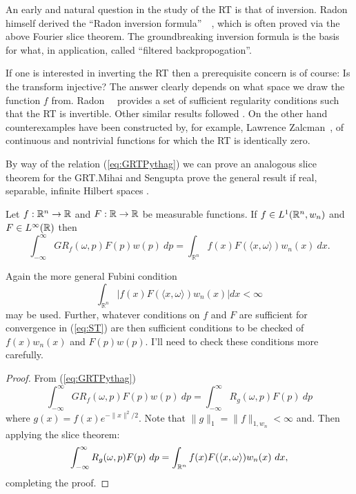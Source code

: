 An early and natural question in the study of the RT is that of inversion. Radon himself derived the ``Radon inversion formula''~\cite{Rado17}~\cite{Rado86}, which is often proved via the above Fourier slice theorem. The groundbreaking inversion formula is the basis for what, in application, called ``filtered backpropogation''.

If one is interested in inverting the RT then a prerequisite concern is of course: Is the transform injective? The answer clearly depends on what space we draw the function $f$ from. Radon~\cite{Rado17}~\cite{Rado86} provides a set of sufficient regularity conditions such that the RT is invertible. Other similar results followed \cite{????}. On the other hand counterexamples have been constructed by, for example, Lawrence Zalcman~\cite{Zalc82}, of continuous and nontrivial functions for which the RT is identically zero.

By way of the relation (\ref{eq:GRTPythag}) we can prove an analogous slice theorem for the GRT.\@ Mihai and Sengupta prove the general result if real, separable, infinite Hilbert spaces \cn.

\begin{proposition} 
  Let $f:\mathbb{R}^n \rightarrow \mathbb{R}$ and $F:\mathbb{R} \rightarrow \mathbb{R}$ be measurable functions. If $f \in L^1(\mathbb{R}^n, w_n)$ and $F \in L^\infty(\mathbb{R})$ then
  \begin{equation}\label{eq:GST}
    \int_{-\infty}^\infty GR_f(\omega, p)F(p) w(p) ~dp
    = \int_{\mathbb{R}^n}f(x) F(\langle x, \omega\rangle) w_n(x) ~dx. 
  \end{equation}
\end{proposition}

\begin{remark}
  Again the more general Fubini condition
  \[
    \int_{\mathbb{R}^n} |f(x) F(\langle x, \omega\rangle) w_n(x)| dx < \infty
  \]
  may be used. Further, whatever conditions on $f$ and $F$ are sufficient for convergence in (\ref{eq:ST}) are then sufficient conditions to be checked of $f(x)w_n(x)$ and $F(p)w(p)$. I'll need to check these conditions more carefully.
\end{remark}



\begin{proof}
  From (\ref{eq:GRTPythag})
  \[
    \int_{-\infty}^\infty GR_f(\omega, p)F(p) w(p) ~dp 
    = \int_{-\infty}^\infty R_g(\omega, p) F(p) ~dp
  \]
  where $g(x) = f(x)e^{-\|x\|^2/2}$. Note that $\|g\|_1 = \|f\|_{1,w_n} < \infty$ and. Then applying the slice theorem:
  \[
    \int_{-\infty}^\infty R_g(\omega, p) F(p) ~dp 
    = \int_{\mathbb{R}^n} f(x)F(\langle x, \omega \rangle) w_n(x) ~dx,
  \]
  completing the proof.
\end{proof}

